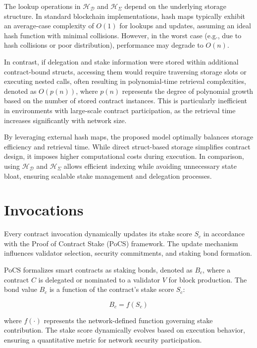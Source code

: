 \documentclass{article}
\begin{document}
The lookup operations in $\mathcal{H}_\mathcal{D}$ and $\mathcal{H}_\Sigma$ depend on the underlying storage structure. In standard blockchain implementations, hash maps typically exhibit an average-case complexity of $O(1)$ for lookups and updates, assuming an ideal hash function with minimal collisions. However, in the worst case (e.g., due to hash collisions or poor distribution), performance may degrade to $O(n)$.  

In contrast, if delegation and stake information were stored within additional contract-bound structs, accessing them would require traversing storage slots or executing nested calls, often resulting in polynomial-time retrieval complexities, denoted as $O(p(n))$, where $p(n)$ represents the degree of polynomial growth based on the number of stored contract instances. This is particularly inefficient in environments with large-scale contract participation, as the retrieval time increases significantly with network size.

By leveraging external hash maps, the proposed model optimally balances storage efficiency and retrieval time. While direct struct-based storage simplifies contract design, it imposes higher computational costs during execution. In comparison, using $\mathcal{H}_\mathcal{D}$ and $\mathcal{H}_\Sigma$ allows efficient indexing while avoiding unnecessary state bloat, ensuring scalable stake management and delegation processes.

\section{Invocations}  

Every contract invocation dynamically updates its stake score $S_c$ in accordance with the Proof of Contract Stake (PoCS) framework. The update mechanism influences validator selection, security commitments, and staking bond formation.  

PoCS formalizes smart contracts as staking bonds, denoted as $B_c$, where a contract $C$ is delegated or nominated to a validator $V$ for block production. The bond value $B_c$ is a function of the contract’s stake score $S_c$:  

\begin{equation}
B_c = f(S_c)
\end{equation}

where $f(\cdot)$ represents the network-defined function governing stake contribution. The stake score dynamically evolves based on execution behavior, ensuring a quantitative metric for network security participation.  
\end{document}
